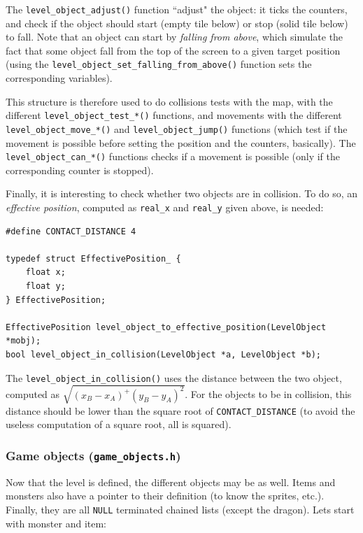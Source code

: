 \documentclass[12pt,a4paper]{article}
\newcommand{\cc}[1]{\texttt{#1}}
\begin{document}
The \cc{level_object_adjust()} function ``adjust" the object: it ticks the counters, and check if the object should start (empty tile below) or stop (solid tile below) to fall. Note that an object can start by \textit{falling from above}, which simulate the fact that some object fall from the top of the screen to a given target position (using the \cc{level_object_set_falling_from_above()} function sets the corresponding variables).

This structure is therefore used to do collisions tests with the map, with the different \cc{level_object_test_*()} functions, and movements with the different \cc{level_object_move_*()} and \cc{level_object_jump()} functions (which test if the movement is possible before setting the position and the counters, basically). The \cc{level_object_can_*()} functions checks if a movement is possible (only if the corresponding counter is stopped).

Finally, it is interesting to check whether two objects are in collision. To do so, an \textit{effective position}, computed as \cc{real_x} and \cc{real_y} given above, is needed:
\begin{verbatim}
#define CONTACT_DISTANCE 4

typedef struct EffectivePosition_ {
	float x;
	float y;
} EffectivePosition;

EffectivePosition level_object_to_effective_position(LevelObject *mobj);
bool level_object_in_collision(LevelObject *a, LevelObject *b);
\end{verbatim}

The \cc{level_object_in_collision()} uses the distance between the two object, computed as $\sqrt{(x_B-x_A)^+(y_B-y_A)^2}$. For the objects to be in collision, this distance should be lower than the square root of \cc{CONTACT_DISTANCE} (to avoid the useless computation of a square root, all is squared).

\subsubsection{Game objects (\texttt{game\_objects.h})}

Now that the level is defined, the different objects may be as well. Items and monsters also have a pointer to their definition (to know the sprites, etc.). Finally, they are all \cc{NULL} terminated chained lists (except the dragon). Lets start with monster and item:
\end{document}
